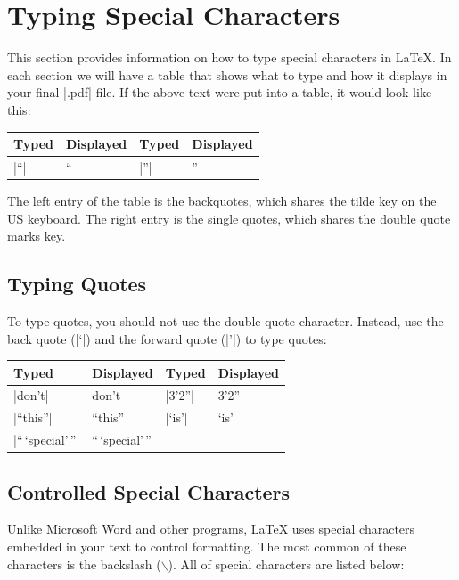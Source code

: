 \section{Typing Special Characters}
This section provides information on how to type special characters in
\LaTeX. In each section we will have a table that shows what to type
and how it displays in your final |.pdf| file.  If the above text were
put into a table, it would look like this:

\begin{center}
\begin{tabular}{l|l||l|l}
Typed & Displayed & Typed & Displayed \\\hline
|``|  & ``        & |''|  & '' \\
\end{tabular}
\end{center}

The left entry of the table is the backquotes, which shares the tilde key on the US keyboard.
The right entry is the single quotes, which shares the double quote marks key.

\subsection{Typing Quotes}

To type quotes, you should not use the double-quote character. Instead,
use the back quote (|`|) and the forward quote (|'|)
to type quotes:

\begin{center}
\begin{tabular}{l|l||l|l}
Typed               & Displayed & Typed   & Displayed\\\hline
|don't|             & don't     &  |3'2''|  & 3'2''\\
|``this''|          & ``this''  & |`is'|  & `is' \\
|``\,`special'\,''| & ``\,`special'\,'' \\
\end{tabular}
\end{center}


\subsection{Controlled Special Characters}\label{special}

Unlike Microsoft Word and other programs, \LaTeX{} uses special
characters embedded in your text to control formatting. The most
common of these characters is the backslash ($\backslash$). All of
special characters are listed below:

